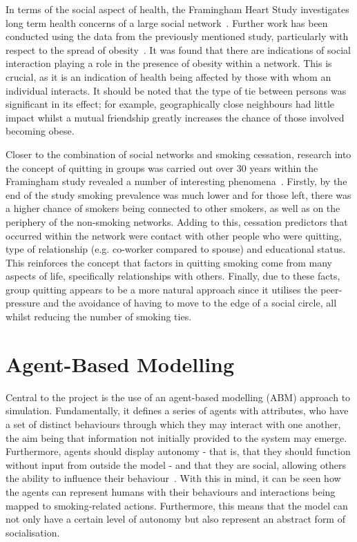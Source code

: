 \documentclass[]{report}
\begin{document}
In terms of the social aspect of health, the Framingham Heart Study investigates long term health concerns of a large social network~\cite{framingham}. Further work has been conducted using the data from the previously mentioned study, particularly with respect to the spread of obesity~\cite{obPap}. It was found that there are indications of social interaction playing a role in the presence of obesity within a network. This is crucial, as it is an indication of health being affected by those with whom an individual interacts. It should be noted that the type of tie between persons was significant in its effect; for example, geographically close neighbours had little impact whilst a mutual friendship greatly increases the chance of those involved becoming obese.

Closer to the combination of social networks and smoking cessation, research into the concept of quitting in groups was carried out over 30 years within the Framingham study revealed a number of interesting phenomena~\cite{droves}. Firstly, by the end of the study smoking prevalence was much lower and for those left, there was a higher chance of smokers being connected to other smokers, as well as on the periphery of the non-smoking networks. Adding to this, cessation predictors that occurred within the network were contact with other people who were quitting, type of relationship (e.g. co-worker compared to spouse) and educational status. This reinforces the concept that factors in quitting smoking come from many aspects of life, specifically relationships with others. Finally, due to these facts, group quitting appears to be a more natural approach since it utilises the peer-pressure and the avoidance of having to move to the edge of a social circle, all whilst reducing the number of smoking ties.

\section{Agent-Based Modelling}
Central to the project is the use of an agent-based modelling (ABM) approach to simulation. Fundamentally, it defines a series of agents with attributes, who have a set of distinct behaviours through which they may interact with one another, the aim being that information not initially provided to the system may emerge. Furthermore, agents should display autonomy - that is, that they should function without input from outside the model - and that they are social, allowing others the ability to influence their behaviour~\cite{repast-tut}. With this in mind, it can be seen how the agents can represent humans with their behaviours and interactions being mapped to smoking-related actions. Furthermore, this means that the model can not only have a certain level of autonomy but also represent an abstract form of socialisation.
\end{document}
